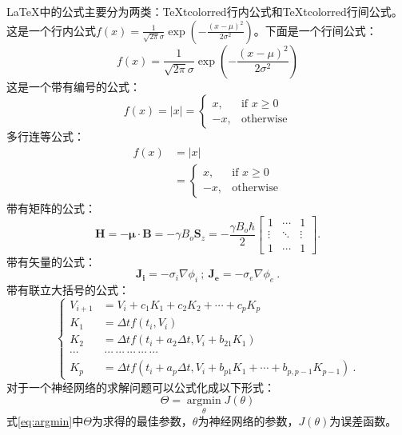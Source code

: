\documentclass[UTF8]{ctexart}
\numberwithin{equation}{section} %
\numberwithin{table}{section} %
\newcommand{\argmin}{\mathop{\mathrm{argmin}}\limits}
\newcommand{\red}[1]{{\TeX tcolor{red}{#1}}}%
\begin{document}
\LaTeX  中的公式主要分为两类：\red{行内公式}和\red{行间公式}。
这是一个行内公式$f(x) = \frac{1}{\sqrt{2\pi}\sigma}\exp{(-\frac{(x-\mu)^2}{2\sigma^2})}$。下面是一个行间公式：
$$
f(x) = \frac{1}{\sqrt{2\pi}\sigma}\exp{(-\frac{(x-\mu)^2}{2\sigma^2})}
$$
这是一个带有编号的公式：
\begin{equation}
f(x)= |x| = 
\begin{cases}
x,& \text{if } x\geq 0\\
-x,              & \text{otherwise}
\end{cases}
\label{eq:cases}
\end{equation}
多行连等公式：
\begin{equation}
\begin{split}
f(x) &= |x| \\
&= \begin{cases}
x,& \text{if } x\geq 0\\
-x,              & \text{otherwise}
\end{cases}
\end{split}
\end{equation}
带有矩阵的公式：
\begin{equation}
\mathbf{H} = -\mathbf\mu \cdot \mathbf{B} = -\gamma B_o \mathbf{S}_z = -\frac{\gamma B_o\hbar}{2} 
\begin{bmatrix}
1& \cdots &1\\ 
\vdots & \ddots & \vdots \\
1 & \cdots & 1 
\end{bmatrix}.
\label{eq:matrix}
\end{equation}
带有矢量的公式：%
\begin{equation}
\label{eq:current_density_inandout}
\bm{J_i} = -\sigma_i \nabla \phi_i ~;~ \bm{J_e}= -\sigma_e \nabla \phi_e ~.
\end{equation}
带有联立大括号的公式：%
\begin{equation}
\label{eq:runge_p_eq}
\left\lbrace
\begin{aligned}
V_{i+1} &= V_i + c_1 K_1 + c_2 K_2 + \cdots + c_p K_p \\
K_1 &= \Delta t f(t_i ,V_i) \\
K_2 &= \Delta t f\left(t_i + a_2 \Delta t, V_i + b_{21} K_1\right) \\
\cdots&~\cdots~\cdots~\cdots~\cdots~\cdots \\
K_p &= \Delta t f\left( t_i + a_p \Delta t, V_i + b_{p1} K_1 + \cdots + b_{p,p-1} K_{p-1}\right) ~.
\end{aligned}
\right.
\end{equation}
对于一个神经网络的求解问题可以公式化成以下形式：
\begin{equation}
\Theta = \argmin_{\theta} J(\theta)
\label{eq:argmin}
\end{equation}
式\ref{eq:argmin}中$\Theta$为求得的最佳参数，$\theta$为神经网络的参数，$J(\theta)$为误差函数。
\end{document}
